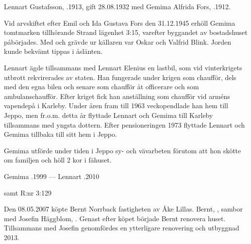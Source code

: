 Lennart Gustafsson, .1913, gift 28.08.1932 med Gemima Alfrida Fors, .1912.
\begin{jhchildren}
  \item {}
  \item {}
  \item {}
  \item {}
  \item {}
\end{jhchildren}
Vid arvskiftet efter Emil och Ida Gustava Fors den 31.12.1945 erhöll Gemima tomtmarken tillhörande Strand lägenhet 3:15, varefter byggandet av bostadshuset påbörjades. Med och grävde ur källaren var Oskar och Valfrid Blink. Jorden kunde bekvämt tippas i åslänten.

Lennart ägde tillsammans med Lennart Elenius en lastbil, som vid vinterkrigets utbrott rekvirerades av staten. Han fungerade under krigen som chaufför, dels med den egna bilen och senare som chaufför åt officerare och som ambulanschaufför. Efter kriget fick han anställning som chaufför vid arméns vapendepå i Karleby. Under åren fram till 1963 veckopendlade han hem till Jeppo, men fr.o.m. detta år flyttade Lennart och Gemima till Karleby tillsammans med yngsta dottern. Efter pensioneringen 1973 flyttade Lennart och Gemima tillbaka till sitt hem i Jeppo.

Gemima utförde under tiden i Jeppo sy- och vävarbeten förutom att hon skötte om familjen och höll 2 kor i fähuset.

Gemima .1999  ---  Lennart .2010



 samt  R:nr 3:129




Den 08.05.2007 köpte Bernt Norrback fastigheten av Åke Lillas. Bernt, ,  sambor med Josefin Häggblom, . Genast efter köpet började Bernt renovera huset. Tillsammans med Josefin genomfördes en ytterligare renovering och utbyggnad 2013.

